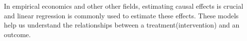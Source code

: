 In empirical economics and other other fields, estimating causal effects is crucial and linear regression is commonly used to estimate these effects. These models help us understand the relationships between a treatment(intervention) and an outcome. 

